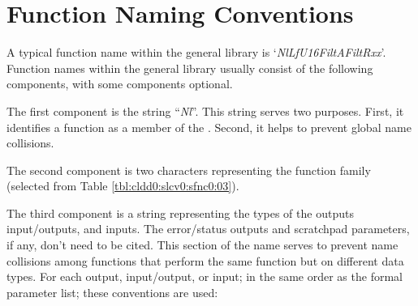 \section{Function Naming Conventions}
\label{cldd0:sfnc0}

A typical function name within the general library is 
`\emph{NlLfU16FiltAFiltRxx}'.  Function names within the 
general library usually consist of the following components, 
with some components optional.  

The first component is the string ``\emph{Nl}''\@.  This 
string serves two purposes.  First, it identifies a function 
as a member of the \emph{\productbasenameshort{}}.  Second, 
it helps to prevent global name collisions.  

The second component is two characters representing the 
function family (selected from Table 
\ref{tbl:cldd0:slcv0:sfnc0:03}).  

The third component is a string representing the types of 
the outputs input/outputs, and inputs.  The error/status 
outputs and scratchpad parameters, if any, don't need to be 
cited.  This section of the name serves to prevent name 
collisions among functions that perform the same function 
but on different data types.  For each output, input/output, 
or input; in the same order as the formal parameter list; 
these conventions are used: 

